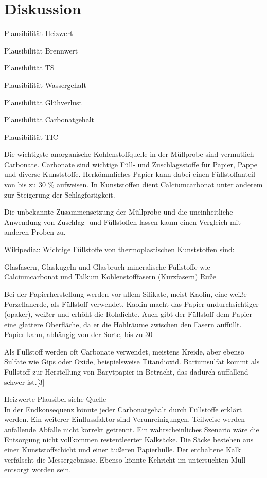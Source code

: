 \chapter{Diskussion}
\label{sec:diskussion}



Plausibilität Heizwert

Plausibilität Brennwert

Plausibilität TS

Plausibilität Wassergehalt

Plausibilität Glühverlust

Plausibilität Carbonatgehalt

Plausibilität TIC


Die wichtigste anorganische Kohlenstoffquelle in der Müllprobe sind vermutlich Carbonate.
Carbonate sind wichtige Füll- und Zuschlagsstoffe für Papier, Pappe und diverse Kunststoffe. Herkömmliches Papier kann dabei einen Füllstoffanteil von bis zu 30 \% aufweisen. In Kunststoffen dient Calciumcarbonat unter anderem zur Steigerung der Schlagfestigkeit. 

Die unbekannte Zusammensetzung der Müllprobe und die uneinheitliche Anwendung von Zuschlag- und Füllstoffen lassen kaum einen Vergleich mit anderen Proben zu. 



Wikipedia::
Wichtige Füllstoffe von thermoplastischen Kunststoffen sind:

Glasfasern, Glaskugeln und Glasbruch
mineralische Füllstoffe wie Calciumcarbonat und Talkum
Kohlenstofffasern (Kurzfasern)
Ruße

Bei der Papierherstellung werden vor allem Silikate, meist Kaolin, eine weiße Porzellanerde, als Füllstoff verwendet. Kaolin macht das Papier undurchsichtiger (opaker), weißer und erhöht die Rohdichte. Auch gibt der Füllstoff dem Papier eine glattere Oberfläche, da er die Hohlräume zwischen den Fasern auffüllt. Papier kann, abhängig von der Sorte, bis zu 30 %

Als Füllstoff werden oft Carbonate verwendet, meistens Kreide, aber ebenso Sulfate wie Gips oder Oxide, beispielsweise Titandioxid. Bariumsulfat kommt als Füllstoff zur Herstellung von Barytpapier in Betracht, das dadurch auffallend schwer ist.[3] 

Heizwerte Plausibel siehe Quelle\\

In der Endkonsequenz könnte jeder Carbonatgehalt durch Füllstoffe erklärt werden. Ein weiterer Einflussfaktor sind Verunreinigungen. Teilweise werden anfallende Abfälle nicht korrekt getrennt. Ein wahrscheinliches Szenario wäre die Entsorgung nicht vollkommen restentleerter Kalksäcke. Die Säcke bestehen aus einer Kunststoffschicht und einer äußeren Papierhülle. Der enthaltene Kalk verfälscht die Messergebnisse. Ebenso könnte Kehricht im untersuchten Müll entsorgt worden sein.


